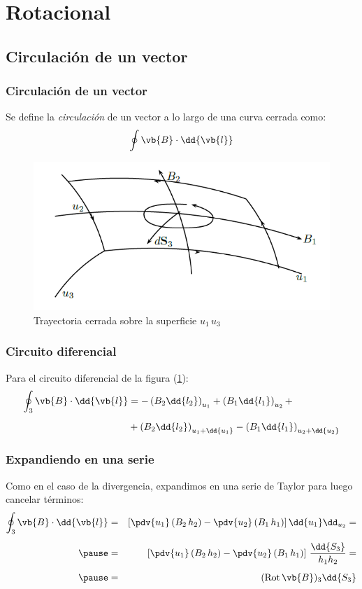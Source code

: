 \section{Rotacional}
\subsection{Circulación de un vector}
\begin{frame}
\frametitle{Circulación de un vector}
Se define la \emph{circulación} de un vector a lo largo de una curva cerrada como:
\begin{align*}
\oint \vb{B} \cdot \dd{\vb{l}}
\end{align*}
\begin{figure}[h!]
    \centering
    \includegraphics[scale=0.4]{Imagenes/Circulacion_Vector.png}
    \caption{Trayectoria cerrada sobre la superficie $u_{1} \, u_{3}$}
    \label{fig:figura_trayectoria_cerrada}
\end{figure}
\end{frame}
\begin{frame}
\frametitle{Circuito diferencial}
Para el circuito diferencial de la figura (\ref{fig:figura_trayectoria_cerrada}):
\begin{align*}
\oint_{3} \vb{B} \cdot \dd{\vb{l}} &= - \left( B_{2} \dd{l_{2}} \right)_{u_{1}} + \left( B_{1} \dd{l_{1}} \right)_{u_{2}} + \\[0.5em]
&+ \left( B_{2} \dd{l_{2}} \right)_{u_{1}+\dd{u_{1}}} - \left( B_{1} \dd{l_{1}} \right)_{u_{2}+\dd{u_{2}}}
\end{align*}
\end{frame}
\begin{frame}
\frametitle{Expandiendo en una serie}
Como en el caso de la divergencia, expandimos en una serie de Taylor para luego cancelar términos:
\begin{eqnarray*}
\oint_{3} \vb{B} \cdot \dd{\vb{l}} &=& \left[ \displaystyle \pdv{u_{1}} \left( B_{2} \, h_{2}\right) - \pdv{u_{2}} \left( B_{1} \, h_{1} \right) \right] \dd{u_{1}} \dd_{u_{2}} = \\[0.5em] \pause
&=& \left[ \pdv{u_{1}} \left( B_{2} \, h_{2}\right) - \pdv{u_{2}} \left( B_{1} \, h_{1} \right) \right] \, \dfrac{\dd{S_{3}}}{h_{1} h_{2}} = \\[0.5em] \pause
&=& ({\rm{Rot}} \, \vb{B})_{3} \dd{S_{3}}
\end{eqnarray*}
\end{frame}
